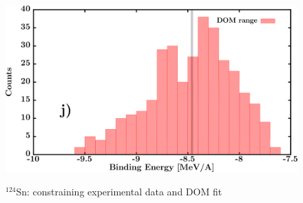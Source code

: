 \documentclass[twocolumn,secnumarabic,amssymb, nobibnotes, aps, prl,
superscriptaddress, nobalancelastpage, draft]{revtex4}
\newcommand{\snFour}{\ensuremath{^{124}}S\lowercase{n}}
\begin{document}
\begin{figure}[!htb]
\begin{minipage}{0.4\linewidth}
        \label{DOM_sn124_RMSRadius}
    \end{minipage}\hspace{6pt}
    \begin{minipage}{0.4\linewidth}
        \centering
        \includegraphics[width=\linewidth]{figures/sn124_BE.png}
        \label{DOM_sn124_BE}
    \end{minipage}
    \caption{\snFour: constraining experimental data and DOM fit}
    \label{DOM_sn124_structural}
\end{figure}
\end{document}
